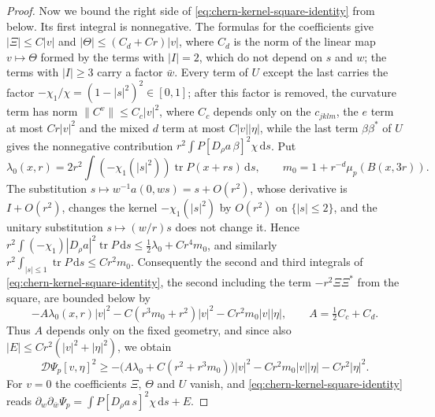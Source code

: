 \begin{proof}
Now we bound the right side of \eqref{eq:chern-kernel-square-identity} from below. Its first integral is nonnegative. The formulas for the coefficients give $|\Xi|\leq C|v|$ and $|\Theta|\leq(C_d+Cr)|v|$, where $C_d$ is the norm of the linear map $v\mapsto\Theta$ formed by the terms with $|I|=2$, which do not depend on $s$ and $w$; the terms with $|I|\geq3$ carry a factor $\bar w$. Every term of $U$ except the last carries the factor $-\chi_1/\chi=(1-|s|^2)^2\in[0,1]$; after this factor is removed, the curvature term has norm $\|C^v\|\leq C_c|v|^2$, where $C_c$ depends only on the $c_{jklm}$, the $e$ term at most $Cr|v|^2$ and the mixed $d$ term at most $C|v||\eta|$, while the last term $\beta\beta^*$ of $U$ gives the nonnegative contribution $r^2\int P[D_\rho a\,\beta]^2\chi\,\mathrm ds$. Put
\[
 \lambda_0(x,r)=2r^2\int(-\chi_1(|s|^2))
                           \operatorname{tr}P(x+rs)\,\mathrm ds,
 \qquad m_0=1+r^{-d}\mu_p(B(x,3r)).
\]
The substitution $s\mapsto w^{-1}a(0,ws)=s+O(r^2)$, whose derivative is $I+O(r^2)$, changes the kernel $-\chi_1(|s|^2)$ by $O(r^2)$ on $\{|s|\leq2\}$, and the unitary substitution $s\mapsto(w/r)s$ does not change it. Hence $r^2\int(-\chi_1)|D_\rho a|^2\operatorname{tr}P\,\mathrm ds\leq\frac12\lambda_0+Cr^4m_0$, and similarly $r^2\int_{|s|\leq1}\operatorname{tr}P\,\mathrm ds\leq Cr^2m_0$. Consequently the second and third integrals of \eqref{eq:chern-kernel-square-identity}, the second including the term $-r^2\Xi\Xi^*$ from the square, are bounded below by
\[
 -A\lambda_0(x,r)|v|^2
       -C(r^3m_0+r^2)|v|^2-Cr^2m_0|v||\eta|,
 \qquad A=\tfrac12C_c+C_d .
\]
Thus $A$ depends only on the fixed geometry, and since also $|E|\leq Cr^2(|v|^2+|\eta|^2)$, we obtain
\begin{equation}\label{eq:chern-potential-joint-bound}
 \mathcal D\Psi_p[v,\eta]^2\geq-\bigl(A\lambda_0+C(r^2+r^3m_0)\bigr)|v|^2-Cr^2m_0|v||\eta|-Cr^2|\eta|^2.
\end{equation}
For $v=0$ the coefficients $\Xi$, $\Theta$ and $U$ vanish, and \eqref{eq:chern-kernel-square-identity} reads $\partial_w\partial_{\bar w}\Psi_p=\int P[D_\rho a\,s]^2\chi\,\mathrm ds+E$.


\end{proof}
